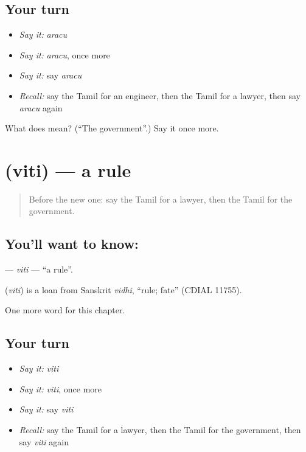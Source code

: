 \subsection*{Your turn}
\begin{itemize}
\raggedright
  \item \emph{Say it:} \emph{aracu}
  \item \emph{Say it:} \emph{aracu}, once more
  \item \emph{Say it:} say \emph{aracu}
  \item \emph{Recall:} say the Tamil for an engineer, then the Tamil for a lawyer, then say \emph{aracu} again
\end{itemize}

\begin{tcolorbox}[breakable,colback=teal!4,colframe=teal!35!black,title={Before you move on}]
What does  mean? (\textquotedblleft{}The government\textquotedblright{}.) Say it once more.
\end{tcolorbox}
\section[\texorpdfstring{\ta{விதி} (viti)}{விதி (viti)}]{ (viti) — a rule}

\label{lesson:TA-C280-viti}



\begin{quote}
Before the new one: say the Tamil for a lawyer, then the Tamil for the government.
\end{quote}

\subsection*{You'll want to know: }
\textbf{} — \emph{viti} — \textquotedblleft{}a rule\textquotedblright{}.

\begin{cousinweb}
\textbf{} (\emph{viti}) is a loan from Sanskrit \emph{vidhi}, \textquotedblleft{}rule; fate\textquotedblright{} (CDIAL 11755).
\end{cousinweb}

\begin{grammarlens}[title={What you've built}]
One more word for this chapter.
\end{grammarlens}

\subsection*{Your turn}
\begin{itemize}
\raggedright
  \item \emph{Say it:} \emph{viti}
  \item \emph{Say it:} \emph{viti}, once more
  \item \emph{Say it:} say \emph{viti}
  \item \emph{Recall:} say the Tamil for a lawyer, then the Tamil for the government, then say \emph{viti} again
\end{itemize}

